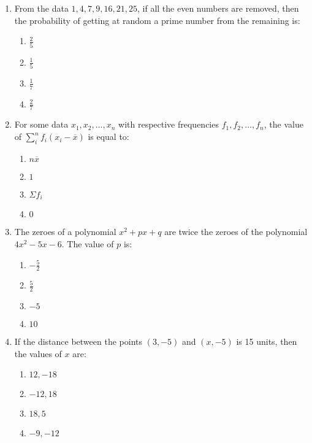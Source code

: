 \documentclass[12pt,-letter paper]{article}
\providecommand{\brak}[1]{\ensuremath{\left(#1\right)}}
\providecommand{\brak}[1]{\ensuremath{\left(#1\right)}}
\begin{document}
\begin{enumerate}
\item From the data $1, 4, 7, 9, 16, 21, 25$, if all the even numbers are removed, then the probability of getting at random a prime number from the remaining is:
	\begin{enumerate}
\item $\frac{2}{5}$
    \item $\frac{1}{5}$
    \item $\frac{1}{7}$
    \item $\frac{2}{7}$
	\end{enumerate}
		\newpage
	\item For some data $x_{1}, x_{2}, \dots, x_{n}$ with respective frequencies $f_{1}, f_{2}, \dots, f_{n}$, the value of $\sum_{i}^{n}f_{i} \brak{x_{i} - \overline{x}}$ is equal to:
	\begin{enumerate}    
\item $n \overline{x}$
    \item $1$
    \item $\Sigma f_{i}$
    \item $0$
	\end{enumerate}
\item The zeroes of a polynomial $x^2 + px + q$ are twice the zeroes of the polynomial $4x^2 - 5x - 6$. The value of $p$ is:
	\begin{enumerate}   
\item $-\frac{5}{2}$
    \item $\frac{5}{2}$
    \item $-5$
    \item $10$
	\end{enumerate}
\item If the distance between the points $\brak{3, -5}$ and $\brak{x, -5}$ is 15 units, then the values of $x$ are:
    \begin{enumerate}
    \item $12, -18$
    \item $-12, 18$
    \item $18, 5$
    \item $-9, -12$
    \end{enumerate}
    

\end{enumerate}
\end{document}
